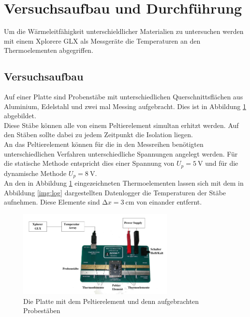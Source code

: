 \section{Versuchsaufbau und Durchführung}

\noindent Um die Wärmeleitfähigkeit unterschieldlicher Materialien zu untersuchen werden mit einem Xplorere GLX als Messgeräte die Temperaturen an den Thermoelementen abgegriffen.

\subsection{Versuchsaufbau}
Auf einer Platte sind Probenstäbe mit unterschiedlichen Querschnittsflächen aus Aluminium, Edelstahl und zwei mal Messing aufgebracht.
Dies ist in Abbildung \ref{img:plat} abgebildet.\\
Diese Stäbe können alle von einem Peltierelement simultan erhitzt werden. Auf den Stäben sollte dabei zu jedem Zeitpunkt die Isolation liegen.\\
An das Peltierelement können für die in den Messreihen benötigten unterschiedlichen Verfahren unterschiedliche Spannungen angelegt werden.
Für die statische Methode entspricht dies einer Spannung von $U_p =\SI{5}{\volt}$ und für die dynamische Methode $U_p =\SI{8}{\volt}$.\\
An den in Abbildung \ref{img:plat} eingezeichneten Thermoelementen lassen sich mit dem in Abbildung \ref{img:log} dargestellten Datenlogger die Temperaturen der Stäbe aufnehmen.
Diese Elemente sind $\increment x = \SI{3}{\centi\metre}$ von einander entfernt.

\begin{figure}[ht]
    \centering
    \includegraphics[width=0.7\textwidth]{latex/images/platine.PNG}
    \caption{Die Platte mit dem Peltierelement und denn aufgebrachten Probestäben \protect \cite{V204}}
  \label{img:plat}
\end{figure}

